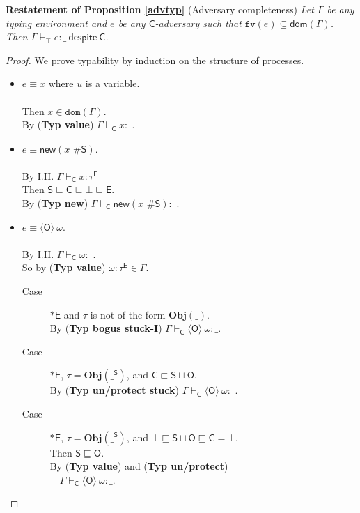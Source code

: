 \documentclass{sigplanconf}
\newcommand{\labo}{\mathsf O}
\newcommand{\labb}{\mathsf S}
\newcommand{\labt}{\mathsf E}
\newcommand{\labc}{\mathsf C}
\newcommand{\fv}{\mathtt{fv}}
\newcommand{\trule}[1]{(\textbf{Typ #1})}
\newcommand{\dom}{\mathtt{dom}}
\begin{document}
$ $\\
{\bf Restatement of Proposition \ref{advtyp}} (Adversary completeness) {\em Let
  $\Gamma$ be any typing environment and $e$ be any $\labc$-adversary  such that $\fv(e) \subseteq
  \mathsf{dom}(\Gamma)$.
Then $\Gamma \vdash_\top e : \_~\mathsf{despite}~\labc$.
}
\begin{proof} We prove typability by induction on the structure of processes.
\begin{itemize}
\item $e \equiv x$ where $u$ is a variable.\\
\\
Then $x \in \dom(\Gamma)$.\\
By \trule{value} $\Gamma \vdash_{\labc} x :_\_$.\\
\item $e \equiv \mathsf{new}(x\mbox{ \# }\labb)$.\\
\\
By I.H. $\Gamma \vdash_{\labc} x : \tau^{\labt}$\\
Then $\labb \sqsubseteq \labc \sqsubseteq \bot \sqsubseteq \labt$.\\
By \trule{new} $\Gamma \vdash_{\labc} \mathsf{new}(x\mbox{ \# }\labb) : \_$.\\
\item $e \equiv \langle\labo\rangle~\omega$.\\
\\
By I.H. $\Gamma \vdash_{\labc} \omega : \_$.\\
So by \trule{value} $\omega : \tau^{\labt} \in \Gamma$.
\begin{description}
\item[Case] $\ast \labt$ and $\tau$ is not of the form $\mathbf{Obj}(\_)$.\\
By \trule{bogus stuck-I} $\Gamma \vdash_{\labc} \langle\labo\rangle~\omega : \_$.
\item[Case] $\ast \labt$, $\tau = \mathbf{Obj}(\_^{\labb})$, and $\labc \sqsubset \labb \sqcup \labo$.\\
By \trule{un/protect stuck} $\Gamma \vdash_{\labc} \langle\labo\rangle~\omega : \_$.
\item[Case] $\ast \labt$, $\tau = \mathbf{Obj}(\_^{\labb})$, and $\bot \sqsubseteq \labb \sqcup \labo \sqsubseteq \labc = \bot$.\\
Then $\labb \sqsubseteq \labo$.\\
By \trule{value} and \trule{un/protect} \\
$~~~$ $\Gamma \vdash_{\labc} \langle\labo\rangle~\omega : \_$.

\end{description}
\end{itemize}
\end{proof}
\end{document}
